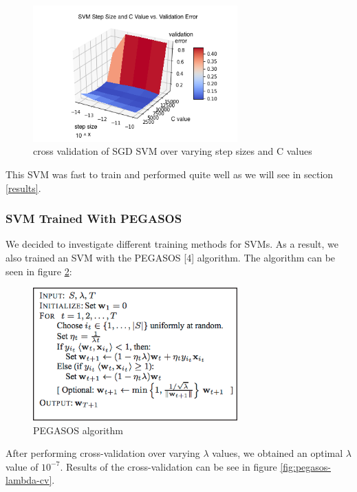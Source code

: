 \documentclass{article} %
\begin{document}
\begin{figure}[h]
\centering
\includegraphics[width=0.7\textwidth]{svm-step-C-cv.png}
\caption{cross validation of SGD SVM over varying step sizes and C values}
\label{fig:svm-step-C-cv}
\end{figure}

This SVM was fast to train and performed quite well as we will see in section \ref{results}.

\subsubsection{SVM Trained With PEGASOS}
We decided to investigate different training methods for SVMs. As a result, we
also trained an SVM with the PEGASOS [4] algorithm. The algorithm can be seen in
figure \ref{fig:pegasos}:

\begin{figure}[h]
\centering
\includegraphics[width=0.7\textwidth]{pegasos.png}
\caption{PEGASOS algorithm}
\label{fig:pegasos}
\end{figure}

After performing cross-validation
over varying $\lambda$ values, we obtained an optimal $\lambda$ value of
$10^{-7}$. Results of the cross-validation can be see in figure \ref{fig:pegasos-lambda-cv}.
\end{document}
